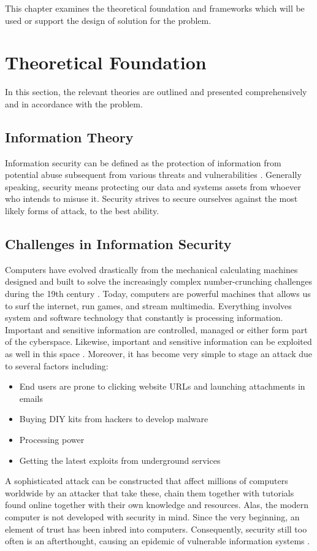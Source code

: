 
This chapter examines the theoretical foundation and frameworks which will be used or support the design of solution for the problem.

\section{Theoretical Foundation}
In this section, the relevant theories are outlined and presented comprehensively and in accordance with the problem.

\subsection{Information Theory}
Information security can be defined as the protection of information from potential abuse subsequent from various threats and vulnerabilities \cite{von_Solms_2013}. Generally speaking, security means protecting our data and systems assets from whoever who intends to misuse it. Security strives to secure ourselves against the most likely forms of attack, to the best ability.
\subsection{Challenges in Information Security}\label{sec:challenges-in-is}
Computers have evolved drastically from the mechanical calculating machines designed and built to solve the increasingly complex number-crunching challenges during the 19th century \cite{history_of_computers}. Today, computers are powerful machines that allows us to surf the internet, run games, and stream multimedia. Everything involves system and software technology that constantly is processing information. Important and sensitive information are controlled, managed or either form part of the cyberspace. Likewise, important and sensitive information can be exploited as well in this space \cite{Li_2021}. Moreover, it has become very simple to stage an attack due to several factors including:
\begin{itemize}
    \item End users are prone to clicking website URLs and launching attachments in emails
    \item Buying DIY kits from hackers to develop malware
    \item Processing power 
    \item Getting the latest exploits from underground services
\end{itemize}
A sophisticated attack can be constructed that affect millions of computers worldwide by an attacker that take these, chain them together with tutorials found online together with their own knowledge and resources. Alas, the modern computer is not developed with security in mind. Since the very beginning, an element of trust has been inbred into computers. Consequently, security still too often is an afterthought, causing an epidemic of vulnerable information systems \cite{death2017information}.

